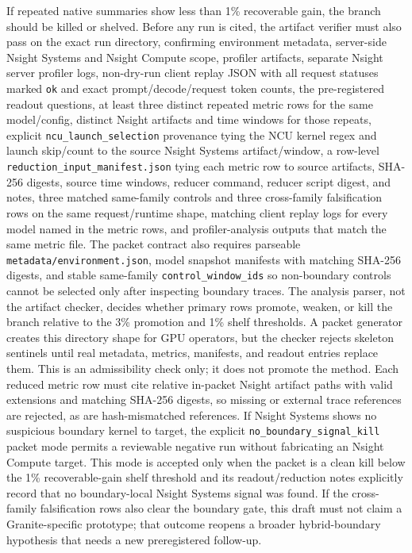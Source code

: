 \documentclass{article}
\begin{document}
If repeated native summaries show less than 1\% recoverable gain, the branch should be killed or shelved. Before any run is cited, the artifact verifier must also pass on the exact run directory, confirming environment metadata, server-side Nsight Systems and Nsight Compute scope, profiler artifacts, separate Nsight server profiler logs, non-dry-run client replay JSON with all request statuses marked \texttt{ok} and exact prompt/decode/request token counts, the pre-registered readout questions, at least three distinct repeated metric rows for the same model/config, distinct Nsight artifacts and time windows for those repeats, explicit \texttt{ncu\_launch\_selection} provenance tying the NCU kernel regex and launch skip/count to the source Nsight Systems artifact/window, a row-level \texttt{reduction\_input\_manifest.json} tying each metric row to source artifacts, SHA-256 digests, source time windows, reducer command, reducer script digest, and notes, three matched same-family controls and three cross-family falsification rows on the same request/runtime shape, matching client replay logs for every model named in the metric rows, and profiler-analysis outputs that match the same metric file. The packet contract also requires parseable \texttt{metadata/environment.json}, model snapshot manifests with matching SHA-256 digests, and stable same-family \texttt{control\_window\_ids} so non-boundary controls cannot be selected only after inspecting boundary traces. The analysis parser, not the artifact checker, decides whether primary rows promote, weaken, or kill the branch relative to the 3\% promotion and 1\% shelf thresholds. A packet generator creates this directory shape for GPU operators, but the checker rejects skeleton sentinels until real metadata, metrics, manifests, and readout entries replace them. This is an admissibility check only; it does not promote the method.
Each reduced metric row must cite relative in-packet Nsight artifact paths with valid extensions and matching SHA-256 digests, so missing or external trace references are rejected, as are hash-mismatched references. If Nsight Systems shows no suspicious boundary kernel to target, the explicit \texttt{no\_boundary\_signal\_kill} packet mode permits a reviewable negative run without fabricating an Nsight Compute target. This mode is accepted only when the packet is a clean kill below the 1\% recoverable-gain shelf threshold and its readout/reduction notes explicitly record that no boundary-local Nsight Systems signal was found.
If the cross-family falsification rows also clear the boundary gate, this draft
must not claim a Granite-specific prototype; that outcome reopens a broader
hybrid-boundary hypothesis that needs a new preregistered follow-up.
\end{document}
